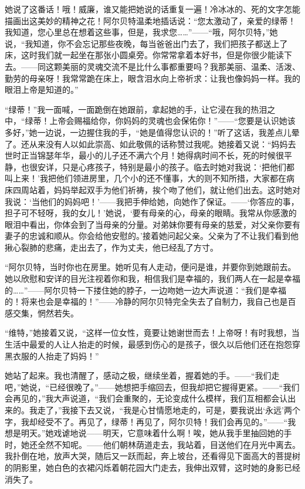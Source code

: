 \documentclass[12pt,oneside]{book}
\begin{document}
她说了这番话！哦！威廉，谁又能把她说的话重复一遍！冷冰冰的、死的文字怎能描画出这美妙的精神之花！阿尔贝特温柔地插话说：“您太激动了，亲爱的绿蒂！我知道，您心里总在想着这些事，但是，我求您……”——“哦，阿尔贝特，”她说，“我知道，你不会忘记那些夜晚，每当爸爸出门去了，我们把孩子都送上了床，这时我们就一起坐在那张小圆桌旁。你常常拿着本好书，但是你很少能读下去。——同这颗美丽的灵魂交流不是比什么事都重要吗？我那美丽、温柔、活泼、勤劳的母亲呀！我常常跪在床上，眼含泪水向上帝祈求：让我也像妈妈一样。我的眼泪上帝是知道的。”

“绿蒂！”我一面喊，一面跪倒在她跟前，拿起她的手，让它浸在我的热泪之中，“绿蒂！上帝会赐福给你，你妈妈的灵魂也会保佑你！”——“您要是认识她该多好，”她一边说，一边握住我的手，“她是值得您认识的！”听了这话，我差点儿晕了。还从来没有人以如此崇高、如此敬佩的话称赞过我呢。她接着又说：“妈妈去世时正当锦瑟年华，最小的儿子还不满六个月！她得病时间不长，死的时候很平静，也很安详，只是心疼孩子，特别是最小的孩子。临去时她对我说：‘把他们都叫上来！’我把他们领进房里，几个小的还不懂事，大的则不知所措，大家都在病床四周站着，妈妈举起双手为他们祈祷，挨个吻了他们，就让他们出去。这时她对我说：‘当他们的妈妈吧！’——我把手伸给她，向她作了保证。——‘你答应的事，担子可不轻呀，我的女儿！’她说，‘要有母亲的心，母亲的眼睛。我常从你感激的眼泪中看出，你体会到了当母亲的分量。对弟妹你要有母亲的慈爱，对父亲你要有妻子的忠诚和顺从。你会给他安慰的。’接着她问起父亲。父亲为了不让我们看到他揪心裂肺的悲痛，走出去了，作为丈夫，他已经乱了方寸。

“阿尔贝特，当时你也在房里。她听见有人走动，便问是谁，并要你到她跟前去。她以欣慰和安详的目光注视着你和我，相信我们是幸福的，我们两人在一起是幸福的……”——阿尔贝特一下搂住她的脖子，一边吻她一边大声说道：“我们是幸福的！将来也会是幸福的！”——冷静的阿尔贝特完全失去了自制力，我自己也是百感交集，惘然若失。

“维特，”她接着又说，“这样一位女性，竟要让她谢世而去！上帝呀！有时我想，当生活中最爱的人让人抬走的时候，最感到伤心的是孩子，很久以后他们还在抱怨穿黑衣服的人抬走了妈妈！”

她站了起来。我也清醒了，感动之极，继续坐着，握着她的手。——“我们走吧，”她说，“已经很晚了。”——她想把手缩回去，但我却把它握得更紧。——“我们会再见的，”我大声说道，“我们会重聚的，无论变成什么模样，我们互相都会认出来的。我走了，”我接下去又说，“我是心甘情愿地走的，可是，要我说出‘永远’两个字，我却经受不了。再见了，绿蒂！再见了，阿尔贝特！我们会再见的。”——“我想是明天。”她戏谑地说——明天，它意味着什么啊！唉，她从我手里抽回她的手时，她还全然不知呢。——他们朝林荫道走去，我站着，目送他们在月光中离去。我扑倒在地，放声大哭，随后又一跃而起，奔上坡台，还看得见下面高大的菩提树的阴影里，她白色的衣裙闪烁着朝花园大门走去，我伸出双臂，这时她的身影已经消失了。
\end{document}
